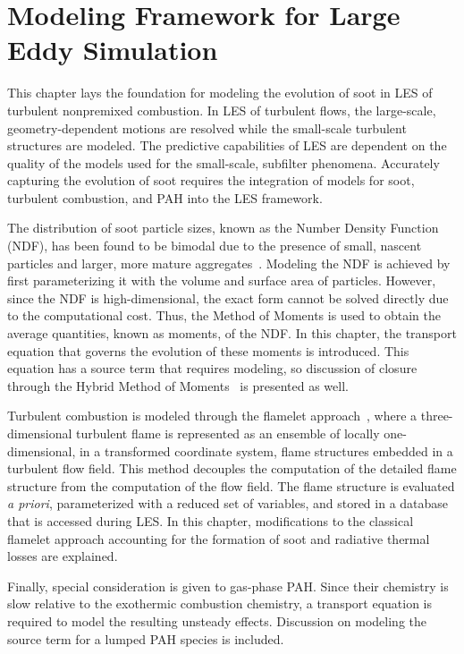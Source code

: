\chapter{Modeling Framework for Large Eddy Simulation\label{ch:lesmodels}}

This chapter lays the foundation for modeling the evolution of soot in LES of turbulent nonpremixed combustion. In LES of turbulent flows, the large-scale, geometry-dependent motions are resolved while the small-scale turbulent structures are modeled. The predictive capabilities of LES are dependent on the quality of the models used for the small-scale, subfilter phenomena. Accurately capturing the evolution of soot requires the integration of models for soot, turbulent combustion, and PAH into the LES framework.

The distribution of soot particle sizes, known as the Number Density Function (NDF), has been found to be bimodal due to the presence of small, nascent particles and larger, more mature aggregates~\cite{zhao2003,zhao2005,netzell2007}. Modeling the NDF is achieved by first parameterizing it with the volume and surface area of particles. However, since the NDF is high-dimensional, the exact form cannot be solved directly due to the computational cost. Thus, the Method of Moments is used to obtain the average quantities, known as moments, of the NDF. In this chapter, the transport equation that governs the evolution of these moments is introduced. This equation has a source term that requires modeling, so discussion of closure through the Hybrid Method of Moments~\cite{hmom2009} is presented as well.

Turbulent combustion is modeled through the flamelet approach~\cite{peters1984}, where a three-dimensional turbulent flame is represented as an ensemble of locally one-dimensional, in a transformed coordinate system, flame structures embedded in a turbulent flow field. This method decouples the computation of the detailed flame structure from the computation of the flow field. The flame structure is evaluated \textit{a priori}, parameterized with a reduced set of variables, and stored in a database that is accessed during LES. In this chapter, modifications to the classical flamelet approach accounting for the formation of soot and radiative thermal losses are explained. %

Finally, special consideration is given to gas-phase PAH. Since their chemistry is slow relative to the exothermic combustion chemistry, a transport equation is required to model the resulting unsteady effects. Discussion on modeling the source term for a lumped PAH species is included.

